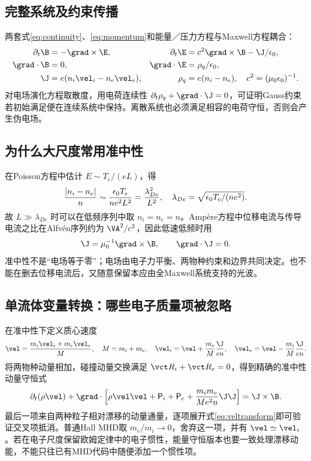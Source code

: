 \subsection{完整系统及约束传播}
两套式\eqref{eq:continuity}、\eqref{eq:momentum}和能量／压力方程与Maxwell方程耦合：
\begin{align}
\partial_t\B&=-\grad\times\E,&\partial_t\E&=c^2\grad\times\B-\J/\epsilon_0,\\
\grad\cdot\B&=0,&\grad\cdot\E&=\rho_q/\epsilon_0,\\
\J&=e(n_i\vel_i-n_e\vel_e),&\rho_q&=e(n_i-n_e),\quad c^2=(\mu_0\epsilon_0)^{-1}.
\end{align}
对电场演化方程取散度，用电荷连续性 $\partial_t\rho_q+\grad\cdot\J=0$，可证明Gauss约束若初始满足便在连续系统中保持。离散系统也必须满足相容的电荷守恒，否则会产生伪电场。

\subsection{为什么大尺度常用准中性}
在Poisson方程中估计 $E\sim T_e/(eL)$，得
\begin{equation}{|n_i-n_e|\over n}\sim{\epsilon_0T_e\over ne^2L^2}
={\lambda_{De}^2\over L^2},\quad\lambda_{De}=\sqrt{\epsilon_0T_e/(ne^2)}.
\end{equation}
故 $L\gg\lambda_{De}$ 时可以在低频序列中取 $n_i=n_e=n$。Ampère方程中位移电流与传导电流之比在Alfvén序列约为 $\VA^2/c^2$，因此低速低频时用
\begin{equation}\J=\mu_0^{-1}\grad\times\B,\qquad\grad\cdot\J=0.\label{eq:ampere}\end{equation}
准中性不是“电场等于零”；电场由电子力平衡、两物种约束和边界共同决定。也不能在删去位移电流后，又随意保留本应由全Maxwell系统支持的光波。

\subsection{单流体变量转换：哪些电子质量项被忽略}
在准中性下定义质心速度
\begin{equation}\vel={m_i\vel_i+m_e\vel_e\over M},\quad M=m_i+m_e,\quad
\vel_i=\vel+{m_e\over M}{\J\over en},\quad
\vel_e=\vel-{m_i\over M}{\J\over en}.\label{eq:veltransform}\end{equation}
将两物种动量相加，碰撞动量交换满足 $\vct R_i+\vct R_e=0$，得到精确的准中性动量守恒式
\begin{equation}
\partial_t(\rho\vel)+\grad\cdot\left[\rho\vel\vel+\mathsf P_i+\mathsf P_e+
{m_im_e\over M e^2n}\J\J\right]=\J\times\B.\label{eq:singlemom}
\end{equation}
最后一项来自两种粒子相对漂移的动量通量，逐项展开式\eqref{eq:veltransform}即可验证交叉项抵消。普通Hall MHD取 $m_e/m_i\to0$，舍弃这一项，并有 $\vel\simeq\vel_i$。若在电子尺度保留欧姆定律中的电子惯性，能量守恒版本也要一致处理漂移动能，不能只往已有MHD代码中随便添加一个惯性项。

